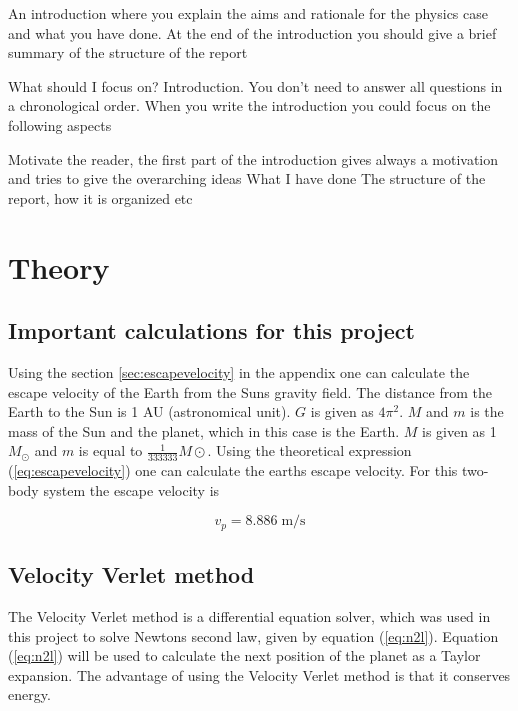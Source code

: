 \documentclass{article}
\begin{document}
An introduction where you explain the aims and rationale for the physics case and what you have done. At the end of the introduction you should give a brief summary of the structure of the report


What should I focus on? Introduction.
You don't need to answer all questions in a chronological order. When you write the introduction you could focus on the following aspects

Motivate the reader, the first part of the introduction gives always a motivation and tries to give the overarching ideas
What I have done
The structure of the report, how it is organized etc

\vspace{1cm}

\section{Theory} \label{sec:Theory}

\subsection{Important calculations for this project}

    Using the section \ref{sec:escapevelocity} in the appendix one can calculate the escape velocity of the Earth from the Suns gravity field. The distance from the Earth to the Sun is 1 AU (astronomical unit). $G$ is given as $4 \pi^{2}$. $M$ and $m$ is the mass of the Sun and the planet, which in this case is the Earth. $M$ is given as 1 $M_{\odot}$ and $m$ is equal to $\frac{1}{333333} M\odot$. Using the theoretical expression (\ref{eq:escapevelocity}) one can calculate the earths escape velocity. For this two-body system the escape velocity is

    \begin{equation}    \label{eq:theoretical escapevelocity}
        v_p = 8.886 \; \textrm{m/s}
    \end{equation}

\subsection{Velocity Verlet method}

    The Velocity Verlet method is a differential equation solver, which was used in this project to solve Newtons second law, given by equation (\ref{eq:n2l}). Equation (\ref{eq:n2l}) will be used to calculate the next position of the planet as a Taylor expansion. The advantage of using the Velocity Verlet method is that it conserves energy. \\
\end{document}
